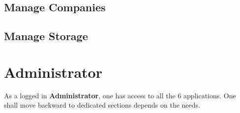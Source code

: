\subsection{Manage Companies}


\subsection{Manage Storage}


\section{Administrator}
As a logged in \textbf{Administrator}, one has access to all the 6 applications. One shall move backward to dedicated sections depends on the needs. 